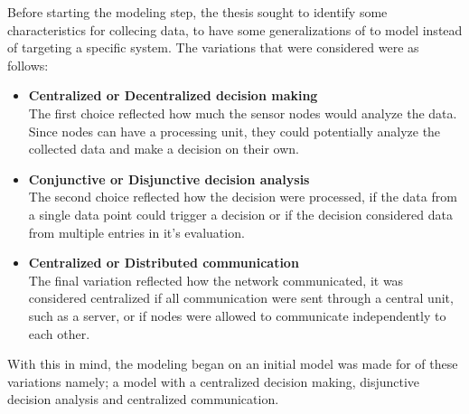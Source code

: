 
Before starting the modeling step, the thesis sought to identify some characteristics for \wsns collecing data, to have some generalizations of \wsns to model instead of targeting a specific system. The variations that were considered were as follows:

\begin{itemize}
\item[] \textbf{Centralized or Decentralized decision making} \\ The first choice reflected how much the sensor nodes would analyze the data. Since nodes can have a processing unit, they could potentially analyze the collected data and make a decision on their own.
\item[] \textbf{Conjunctive or Disjunctive decision analysis} \\ The second choice reflected how the decision were processed, if the data from a single data point could trigger a decision or if the decision considered data from multiple entries in it's evaluation.
\item[] \textbf{Centralized or Distributed communication} \\ The final variation reflected how the network communicated, it was considered centralized if all communication were sent through a central unit, such as a server, or if nodes were allowed to communicate independently to each other. 
\end{itemize}



With this in mind, the modeling began on an initial model was made for of these variations namely; a model with a centralized decision making, disjunctive decision analysis and centralized communication. 





